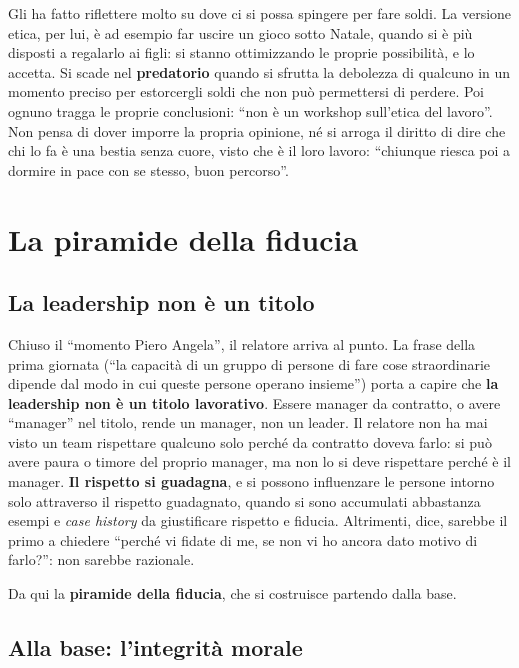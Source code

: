 Gli ha fatto riflettere molto su dove ci si possa spingere per fare soldi. La versione etica, per
lui, è ad esempio far uscire un gioco sotto Natale, quando si è più disposti a regalarlo ai figli:
si stanno ottimizzando le proprie possibilità, e lo accetta. Si scade nel \textbf{predatorio}
quando si sfrutta la debolezza di qualcuno in un momento preciso per estorcergli soldi che non può
permettersi di perdere. Poi ognuno tragga le proprie conclusioni: ``non è un workshop sull'etica del
lavoro''. Non pensa di dover imporre la propria opinione, né si arroga il diritto di dire che chi lo
fa è una bestia senza cuore, visto che è il loro lavoro: ``chiunque riesca poi a dormire in pace con
se stesso, buon percorso''.

\section{La piramide della fiducia}
\label{sec:z2-piramide}

\subsection{La leadership non è un titolo}

Chiuso il ``momento Piero Angela'', il relatore arriva al punto. La frase della prima giornata (``la
capacità di un gruppo di persone di fare cose straordinarie dipende dal modo in cui queste persone
operano insieme'') porta a capire che \textbf{la leadership non è un titolo lavorativo}. Essere
manager da contratto, o avere ``manager'' nel titolo, rende un manager, non un leader. Il relatore
non ha mai visto un team rispettare qualcuno solo perché da contratto doveva farlo: si può avere
paura o timore del proprio manager, ma non lo si deve rispettare perché è il manager. \textbf{Il
rispetto si guadagna}, e si possono influenzare le persone intorno solo attraverso il rispetto
guadagnato, quando si sono accumulati abbastanza esempi e \emph{case history} da giustificare
rispetto e fiducia. Altrimenti, dice, sarebbe il primo a chiedere ``perché vi fidate di me, se non
vi ho ancora dato motivo di farlo?'': non sarebbe razionale.

Da qui la \textbf{piramide della fiducia}, che si costruisce partendo dalla base.

\subsection{Alla base: l'integrità morale}

